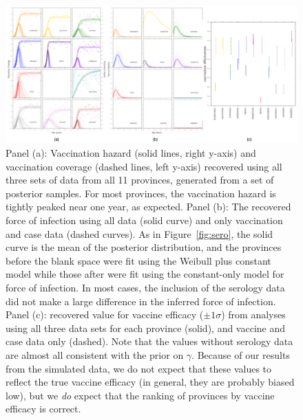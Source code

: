 \documentclass[nofootinbib,aps,pre,twocolumn,superscriptaddress,showkeys,showpacs]{revtex4-1}
\begin{document}
\begin{figure}
\includegraphics[width=\textwidth,angle=0]{figures/VacFOIveff-crop.pdf}
\caption{\label{fig:foivaccveff} Panel (a): Vaccination hazard (solid lines, right y-axis) and vaccination coverage (dashed lines, left y-axis) recovered using all three sets of data from all 11 provinces, generated from a set of posterior samples. For most provinces, the vaccination hazard is tightly peaked near one year, as expected. Panel (b): The recovered force of infection using all data (solid curve) and only vaccination and case data (dashed curves). As in Figure~\ref{fig:sero}, the solid curve is the mean of the posterior distribution, and the provinces before the blank space were fit using the Weibull plus constant model while those after were fit using the constant-only model for force of infection. In most cases, the inclusion of the serology data did not make a large difference in the inferred force of infection. Panel (c): recovered value for vaccine efficacy ($\pm 1\sigma$) from analyses using all three data sets for each province (solid), and vaccine and case data only (dashed). Note that the values without serology data are almost all consistent with the prior on $\gamma$. Because of our results from the simulated data, we do not expect that these values to reflect the true vaccine efficacy (in general, they are probably biased low), but we \emph{do} expect that the ranking of provinces by vaccine efficacy is correct.}
\end{figure}
\end{document}
